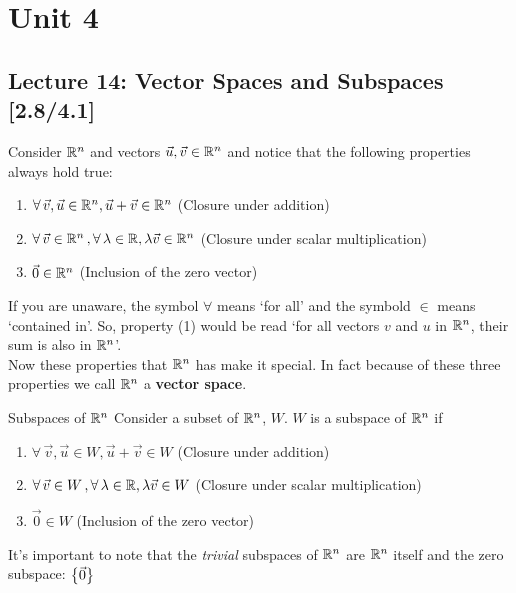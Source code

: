 \section{Unit 4}
\subsection{Lecture 14: Vector Spaces and Subspaces [2.8/4.1]}

Consider $\mathbb R^{n}$ and vectors $\vec{u}, \vec{v} \in \mathbb R^{n}$ and notice that the following properties always hold true:
\begin{enumerate}
    \item $\forall\,\vec{v}, \vec{u} \in \mathbb R^{n}, \vec{u} + \vec{v} \in \mathbb R^{n}$ (Closure under addition)
    \item $\forall\,\vec{v} \in \mathbb R^{n}\,,\forall\,\lambda \in \mathbb R, \lambda\vec{v} \in \mathbb R^{n}$ (Closure under scalar multiplication)
    \item $\vec{0} \in \mathbb R^{n}$ (Inclusion of the zero vector)
\end{enumerate}
If you are unaware, the symbol $\forall$ means `for all' and the symbold $\in$ means `contained in'. So, property (1) would be read `for all vectors $v$ and $u$ in $\mathbb R^{n}$, their sum is also in $\mathbb R^{n}$'. \\ Now these properties that $\mathbb R^{n}$ has make it special. In fact because of these three properties we call $\mathbb R^{n}$ a \textbf{vector space}. 

\begin{defbox}{Subspaces of $\mathbb R^{n}$}{}
    Consider a subset of $\mathbb R^{n}$, $W$. $W$ is a subspace of $\mathbb R^{n}$ if 
    \begin{enumerate}
        \item $\forall\,\vec{v}, \vec{u} \in W, \vec{u} + \vec{v} \in W$ (Closure under addition)
        \item $\forall\,\vec{v} \in W\,,\forall\,\lambda \in \mathbb R, \lambda\vec{v} \in W$ (Closure under scalar multiplication)
        \item $\vec{0} \in W$ (Inclusion of the zero vector)
    \end{enumerate}
\end{defbox}

It's important to note that the \textit{trivial} subspaces of $\mathbb R^n$ are $\mathbb R^n$ itself and the zero subspace: $\left\{\vec{0} \right\}$

